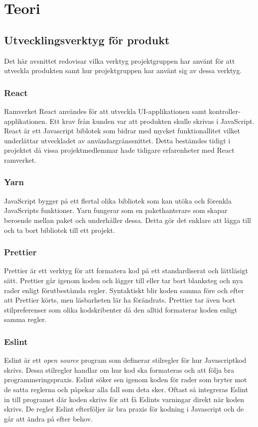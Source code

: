 \chapter{Teori}
\label{cha:theory}

\section{Utvecklingsverktyg för produkt}
Det här avsnittet redovisar vilka verktyg projektgruppen har använt för att utveckla produkten samt hur projektgruppen har använt sig av dessa verktyg.

\subsection*{React}
Ramverket React användes för att utveckla UI-applikationen samt kontroller-applikationen. Ett krav från kunden var att produkten skulle skrivas i JavaScript. React är ett Javascript biblotek som bidrar med mycket funktionallitet vilket underlättar utveckladet av användargränssnittet.  Detta bestämdes tidigt i projektet då vissa projektmedlemmar hade tidigare erfarenheter med React ramverket.

\subsection*{Yarn}
JavaScript bygger på ett flertal olika bibliotek som kan utöka och förenkla JavaScripts funktioner. Yarn fungerar som en pakethanterare som skapar beroende mellan paket och underhåller dessa. Detta gör det enklare att lägga till och ta bort bibliotek till ett projekt.

\subsection*{Prettier}
Prettier är ett verktyg för att formatera kod på ett standardiserat och lättläsigt sätt\cite{prettier}. Prettier går igenom koden och lägger till eller tar bort blanksteg och nya rader enligt förutbestämda regler. Syntaktiskt blir koden samma före och efter att Prettier körts, men läsbarheten lär ha förändrats. Prettier tar även bort stilpreferenser som olika kodskribenter då den alltid formaterar koden enligt samma regler.


\subsection*{Eslint}
Eslint är ett \textit{open source} program som definerar stilregler för hur Javascriptkod skrivs. Dessa stilregler handlar  om hur kod ska formateras och att följa bra programmeringspraxis. Eslint söker sen igenom koden för rader som bryter mot de satta reglerna och påpekar alla fall som deta sker. Oftast så integreras Eslint in till programet där koden skrivs för att få Eslints varningar direkt när koden skrivs. De regler Eslint efterföljer är bra praxis för kodning i Javascript och de går att ändra på efter behov.


